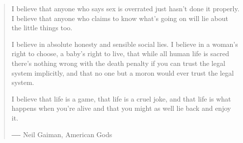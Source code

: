 \begin{quote}
    I believe that anyone who says sex is overrated just hasn't done it properly. I believe that anyone who claims to know what's going on will lie about the little things too. 

    I believe in absolute honesty and sensible social lies. I believe in a woman's right to choose, a baby's right to live, that while all human life is sacred there's nothing wrong with the death penalty if you can trust the legal system implicitly, and that no one but a moron would ever trust the legal system. 

    I believe that life is a game, that life is a cruel joke, and that life is what happens when you're alive and that you might as well lie back and enjoy it.

    \begin{flushright}
    ―- Neil Gaiman, American Gods
    \end{flushright}
\end{quote}